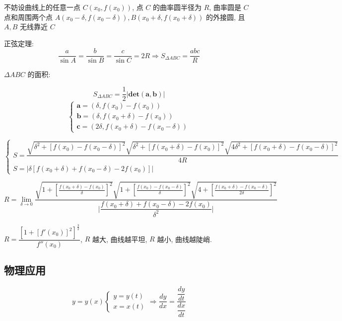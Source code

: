 \begin{anymark}[曲率半径推导]
	不妨设曲线上的任意一点 $C(x_{0},f(x_{0}))$, 点 $C$ 的曲率圆半径为 $R$, 曲率圆是 $C$ 点和周围两个点 
	$A(x_{0}-\delta,f(x_{0}-\delta)),B(x_{0}+\delta,f(x_{0}+\delta))$ 的外接圆, 且 $A,B$ 无线靠近 $C$

	正弦定理:
	$$\dfrac{a}{\sin A} = \dfrac{b}{\sin B} = \dfrac{c}{\sin C} = 2R\Rightarrow S_{\Delta ABC} = \dfrac{abc}{R}$$

	$\Delta ABC$ 的面积:

	$$S_{\Delta ABC} = \dfrac{1}{2}\big|\mathbf{det}(\boldsymbol{a},\boldsymbol{b})\big|$$
	$$\begin{cases} 
		\boldsymbol{a} = (\delta, f(x_{0})-f(x_{0})) \\ 
		\boldsymbol{b} = (\delta,f(x_{0}+\delta)-f(x_{0})) \\ 
		\boldsymbol{c} = (2\delta,f(x_{0}+\delta)-f(x_{0}-\delta))
	\end{cases} $$

	
	$$\begin{cases} 
		S = \dfrac{\sqrt{\delta^{2}+\left[f(x_{0})-f(x_{0}-\delta)\right]^{2}}\sqrt{\delta^{2}+\left[f(x_{0}+\delta)-f(x_{0})\right]^{2}}\sqrt{4\delta^{2}+\left[f(x_{0}+\delta)-f(x_{0}-\delta)\right]^{2}}}{4R} \\ 
		S = \big|\delta\left[f(x_{0}+\delta)+f(x_{0}-\delta)-2f(x_{0})\right]\big|
	\end{cases}$$


	$$ R = \lim\limits_{\delta\to 0}\dfrac{\sqrt{1+\left[\frac{f(x_{0}+\delta)-f(x_{0})}{\delta}\right]^{2}}\sqrt{1+\left[\frac{f(x_{0})-f(x_{0}-\delta)}{\delta}\right]^{2}}\sqrt{4+\left[\frac{f(x_{0}+\delta)-f(x_{0}-\delta)}{2\delta}\right]^{2}}}{\big|\dfrac{f(x_{0}+\delta)+f(x_{0}-\delta)-2f(x_{0})}{\delta^{2}}\big|}$$

	$R = \dfrac{\left[1 + [f'(x_{0})]^{2}\right]^{\frac{3}{2}}}{f''(x_{0})}$, $R$ 越大, 曲线越平坦, $R$ 越小, 曲线越陡峭.
\end{anymark}
\subsection{物理应用}
\begin{definition}[相关变化率]
	$$y=y(x)
	\begin{cases}
		y = y(t) \\
		x = x(t)  
	\end{cases} \Rightarrow
	\dfrac{dy}{dx} = \dfrac{\dfrac{dy}{dt}}{\dfrac{dx}{dt}}$$
\end{definition}

